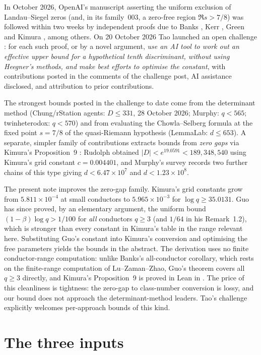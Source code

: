 \documentclass[11pt]{article}
\begin{document}
In October 2026, OpenAI's manuscript \cite{openai} asserting the uniform
exclusion of Landau--Siegel zeros (and, in its family~003, a zero-free
region $\Re s > 7/8$) was followed within two weeks by independent proofs
due to Banks \cite{banks}, Kerr \cite{kerr}, Green \cite{green} and
Kimura \cite{kimura}, among others. On 20 October 2026 Tao launched an
open challenge \cite{tao}: for each such proof, or by a novel argument,
\emph{use an AI tool to work out an effective upper bound for a
hypothetical tenth discriminant, without using Heegner's methods, and make
best efforts to optimise the constant}, with contributions posted in the
comments of the challenge post, AI assistance disclosed, and attribution
to prior contributions.

The strongest bounds posted in the challenge to date come from the
determinant method (Chung/rStation agents: $D \le 331$, 28 October 2026;
Murphy: $q < 565$; twinheterodox: $q < 570$) and from evaluating the
Chowla--Selberg formula at the fixed point $s = 7/8$ of the quasi-Riemann
hypothesis (LemmaLab: $d \le 653$). A separate, simpler family of
contributions extracts bounds from \emph{zero gaps} via Kimura's
Proposition~9 \cite{kimura}: Rudolph \cite{tao} obtained
$|D| < e^{19.0591} < 189{,}348{,}540$ using Kimura's grid constant
$c = 0.004401$, and Murphy's survey records two further chains of this
type giving $d < 6.47\times 10^7$ and $d < 1.23\times 10^8$.

The present note improves the zero-gap family. Kimura's grid constants
grow from $5.811\times 10^{-4}$ at small conductors to
$5.965\times 10^{-3}$ for $\log q \ge 35.0131$. Guo \cite{guo} has since
proved, by an elementary argument, the uniform bound
$(1-\beta)\log q > 1/100$ for \emph{all} conductors $q \ge 3$ (and
$1/64$ in his Remark~1.2), which is stronger than every constant in
Kimura's table in the range relevant here. Substituting Guo's constant
into Kimura's conversion and optimising the free parameters yields the
bounds in the abstract. The derivation uses no finite conductor-range
computation: unlike Banks's all-conductor corollary, which rests on the
finite-range computation of Lu--Zaman--Zhao, Guo's theorem covers all
$q \ge 3$ directly, and Kimura's Proposition~9 is proved in Lean in
\cite{kimura}. The price of this cleanliness is tightness: the zero-gap
to class-number conversion is lossy, and our bound does not approach the
determinant-method leaders. Tao's challenge explicitly welcomes
per-approach bounds of this kind.

\section{The three inputs}
\end{document}
